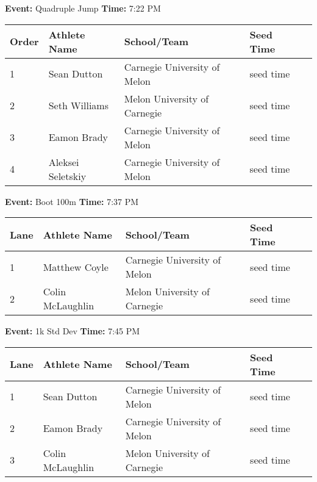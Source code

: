\documentclass[11pt]{article}
\begin{document}
\textbf{Event:} Quadruple Jump \quad \textbf{Time:} 7:22 PM 

\vspace{1em}
\begin{tabular}{@{}lllll@{}}
\toprule

\textbf{Order} & \textbf{Athlete Name} & \textbf{School/Team} & \textbf{Seed Time} \\
\midrule
1 & Sean Dutton & Carnegie University of Melon & seed time &\\
2 & Seth Williams & Melon University of Carnegie & seed time &\\
3 & Eamon Brady & Carnegie University of Melon & seed time &\\
4 & Aleksei Seletskiy & Carnegie University of Melon & seed time &\\
\bottomrule
\end{tabular}
\vspace{2.5em}


\textbf{Event:} Boot 100m \quad \textbf{Time:} 7:37 PM 

\vspace{1em}
\begin{tabular}{@{}lllll@{}}
\toprule

\textbf{Lane} & \textbf{Athlete Name} & \textbf{School/Team} & \textbf{Seed Time} \\
\midrule
1 & Matthew Coyle & Carnegie University of Melon & seed time &\\
2 & Colin McLaughlin & Melon University of Carnegie & seed time &\\
\bottomrule
\end{tabular}
\vspace{2.5em}


\textbf{Event:} 1k Std Dev \quad \textbf{Time:} 7:45 PM 

\vspace{1em}
\begin{tabular}{@{}lllll@{}}
\toprule

\textbf{Lane} & \textbf{Athlete Name} & \textbf{School/Team} & \textbf{Seed Time} \\
\midrule
1 & Sean Dutton & Carnegie University of Melon & seed time &\\
2 & Eamon Brady & Carnegie University of Melon & seed time &\\
3 & Colin McLaughlin & Melon University of Carnegie & seed time &\\
\bottomrule
\end{tabular}
\vspace{2.5em}
\end{document}
